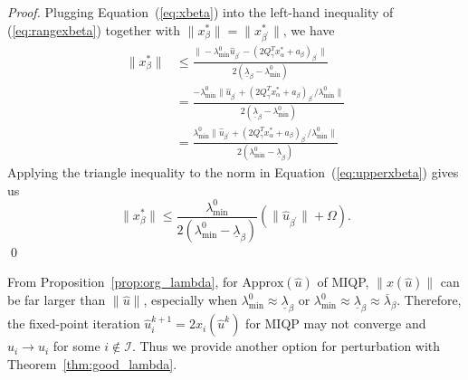 \documentclass[]{article}
\begin{document}
\begin{proof}
        Plugging Equation~(\ref{eq:xbeta}) into the left-hand inequality of (\ref{eq:rangexbeta}) together with $\|x_\beta^*\| = \|x_{\beta^\prime}^*\|$, we have
        \begin{equation}\label{eq:upperxbeta}
        \begin{aligned}
            \|x_\beta^*\|&\leq \frac{\|-\lambda_{\min}^0\hat{u}_{\beta^\prime}-(2Q_\gamma^T x_\alpha^* + a_{\beta})_{\beta^\prime}\|}{2(\underline{\lambda}_\beta -\lambda_{\min}^0)}\\
            &= \frac{-\lambda_{\min}^0\|\hat{u}_{\beta^\prime} +(2Q_\gamma^T x_\alpha^* + a_{\beta})_{\beta^\prime}/\lambda_{\min}^0\|}{2(\underline{\lambda}_\beta -\lambda_{\min}^0)}\\
            &= \frac{\lambda_{\min}^0 \|\hat{u}_{\beta^\prime} +(2Q_\gamma^T x_\alpha^* + a_{\beta})_{\beta^\prime}/\lambda_{\min}^0\|}{2(\lambda_{\min}^0 - \underline{\lambda}_\beta)} 
        \end{aligned}
        \end{equation}
        Applying the triangle inequality to the norm in Equation~(\ref{eq:upperxbeta}) gives us
        \begin{equation}\label{eq:claim3_res}
            \|x_\beta^*\|\leq \frac{\lambda_{\min}^0}{2(\lambda_{\min}^0 - \underline{\lambda}_\beta)}(\|\hat{u}_{\beta^\prime}\| + \Omega).
        \end{equation}\qed
\end{proof}

From Proposition~\ref{prop:org_lambda}, for $\mbox{Approx}(\hat{u})$ of MIQP, $\|x(\hat{u})\|$ can be far larger than $\|\hat{u}\|$, especially when $\lambda_{\min}^0 \approx \underline{\lambda}_\beta$ or $\lambda_{\min}^0 \approx \underline{\lambda}_\beta\approx \overline{\lambda}_\beta$. Therefore, the fixed-point iteration $\hat{u}_{i}^{k+1} = 2x_i(\hat{u}^k)$ for MIQP may not converge and $\hat{u}_i \rightarrow u_i$ for some $i\notin\mathcal{I}$.  Thus we provide another option for perturbation with Theorem~\ref{thm:good_lambda}.
\end{document}

